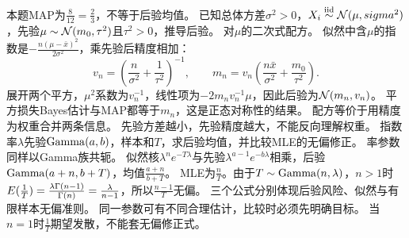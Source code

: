{本题MAP为$\frac{8}{12}=\frac{2}{3}$，不等于后验均值。}
{已知总体方差$\sigma^2>0$，$X_i\overset{\mathrm{iid}}{\sim}\mathcal N(\mu,sigma^2)$，先验$\mu\sim\mathcal N(m_0,\tau^2)$且$\tau^2>0$，推导后验。}
{对$\mu$的二次式配方。}
{似然中含$\mu$的指数是$-\frac{n(\mu-\bar x)^2}{2\sigma^2}$，乘先验后精度相加：
\[v_n=(\dfrac{n}{\sigma^2}+\dfrac{1}{\tau^2})^{-1},\qquad m_n=v_n(\dfrac{n\bar x}{\sigma^2}+\dfrac{m_0}{\tau^2}).\]
展开两个平方，$\mu^2$系数为$v_n^{-1}$，线性项为$-2m_nv_n^{-1}\mu$，因此后验为$\mathcal N(m_n,v_n)$。
平方损失Bayes估计与MAP都等于$m_n$，这是正态对称性的结果。}
{配方等价于用精度为权重合并两条信息。}
{先验方差越小，先验精度越大，不能反向理解权重。}
{指数率$\lambda$先验$\operatorname{Gamma}(a,b)$，样本和$T$，求后验均值，并比较MLE的无偏修正。}
{率参数同样以Gamma族共轭。}
{似然核$\lambda^ne^{-T\lambda}$与先验$\lambda^{a-1}e^{-b\lambda}$相乘，后验$\operatorname{Gamma}(a+n,b+T)$，均值$\frac{a+n}{b+T}$。
MLE为$\frac{n}{T}$。由于$T\sim\operatorname{Gamma}(n,\lambda)$，$n>1$时
$E(\frac{1}{T})=\frac{\lambda\Gamma(n-1)}{\Gamma(n)}=\frac{\lambda}{n-1}$，所以$\frac{n-1}{T}$无偏。
三个公式分别体现后验风险、似然与有限样本无偏准则。}
{同一参数可有不同合理估计，比较时必须先明确目标。}
{当$n=1$时$\frac{1}{T}$期望发散，不能套无偏修正式。}

